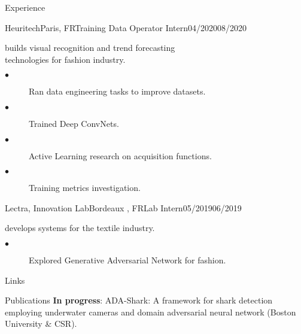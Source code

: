 \documentclass{resume}
\begin{document}
\begin{multicols}{2}
\begin{rSection}{\Large Experience}
		\begin{job}{Heuritech}{Paris, FR}{Training Data Operator Intern}{04/2020}{08/2020}{
			builds visual recognition and trend forecasting \\ technologies for fashion industry.
			\begin{description}
				\item[$\bullet$] Ran data engineering tasks to improve datasets. 
				\item[$\bullet$] Trained Deep ConvNets.
				\item[$\bullet$] Active Learning research on acquisition functions.
				\item[$\bullet$] Training metrics investigation.
			\end{description}
		}
		\end{job}
		\begin{job}{Lectra, Innovation Lab}{Bordeaux , FR}{Lab Intern}{05/2019}{06/2019}{
			develops systems for the textile industry.
			\begin{description}
				\item[$\bullet$] Explored Generative Adversarial Network for fashion.
			\end{description}
		}
		\end{job}
	\end{rSection}
	
	\columnbreak
	
	\begin{rSection}{\Large Links}
	\end{rSection}
	
	\begin{rSection}{\Large Publications}
		\textbf{In progress}: ADA-Shark: A framework for shark detection employing underwater cameras and domain adversarial neural network (Boston University \& CSR). 
	\end{rSection}


\end{multicols}
\end{document}
